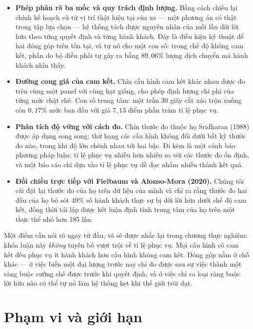 \begin{itemize}[leftmargin=1.2cm,itemsep=3pt,topsep=4pt]
\item \textbf{Phép phân rã ba mốc và quy trách định lượng.} Bằng cách chiếu lại chính kế hoạch
cũ từ vị trí thật hiện tại của xe --- một phương án có thật trong tập lựa chọn --- hệ thống tách
được nguyên nhân của mỗi lần dời lời hứa theo từng quyết định và từng hành khách. Đây là điều kiện
kỹ thuật để hai đóng góp trên tồn tại, và tự nó cho một con số: trong chế độ không cam kết, phần
do bộ điều phối tự gây ra bằng $89{,}06\%$ lượng dịch chuyển mà hành khách nhìn thấy.

\item \textbf{Đường cong giá của cam kết.} Chín cấu hình cam kết khác nhau được đo trên cùng
một panel với cùng hạt giống, cho phép định lượng chi phí của từng mức chặt chẽ. Con số trung
tâm: một trần 30 giây cắt xáo trộn xuống còn $0{,}17\%$ mức ban đầu với giá $7{,}13$ điểm phần
trăm tỉ lệ phục vụ.

\item \textbf{Phân tích độ vững với cách đo.} Chín thước đo thuộc họ Sridharan (1988) được áp
dụng song song; thứ hạng các cấu hình không đổi dưới bất kỳ thước đo nào, trong khi độ lớn
chênh nhau tới hai bậc. Đi kèm là một cảnh báo phương pháp luận: tỉ lệ phục vụ nhiễu hơn nhiều
so với các thước đo ổn định, và một báo cáo chỉ dựa vào tỉ lệ phục vụ dễ đọc nhầm nhiễu thành
kết quả.

\item \textbf{Đối chiếu trực tiếp với Fielbaum và Alonso-Mora (2020).} Chúng tôi cài đặt lại
thước đo của họ trên dữ liệu của mình và chỉ ra rằng thước đo hai đầu của họ bỏ sót $49\%$ số
hành khách thực sự bị dời lời hứa dưới chế độ cam kết, đồng thời tái lập được kết luận định
tính trung tâm của họ trên một thực thể nhỏ hơn 185 lần.
\end{itemize}

Một điểm cần nói rõ ngay từ đầu, và sẽ được nhắc lại trong chương thực nghiệm: khóa luận này
\emph{không} tuyên bố vượt trội về tỉ lệ phục vụ. Mọi cấu hình có cam kết đều phục vụ ít hành
khách hơn cấu hình không cam kết. Đóng góp nằm ở chỗ khác --- ở việc biến một đại lượng trước
nay chỉ đo được sau sự việc thành một ràng buộc cưỡng chế được trước khi quyết định, và ở việc
chỉ ra loại ràng buộc lời hứa nào có thể tự nó làm hệ thống kẹt khi thế giới trôi dạt.

\section{Phạm vi và giới hạn}

